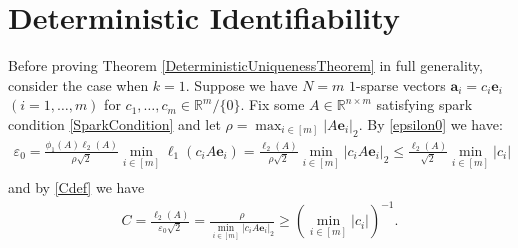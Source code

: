 \documentclass[journal, onecolumn]{IEEEtran}
\begin{document}
 

\section{Deterministic Identifiability}\label{DUT}


Before proving Theorem \ref{DeterministicUniquenessTheorem} in full generality, consider the case when $k=1$. Suppose we have $N = m$ $1$-sparse vectors $\mathbf{a}_i = c_i\mathbf{e}_i$ $(i = 1, \ldots, m)$ for $c_1, \ldots, c_m \in \mathbb{R}^m/\{0\}$. Fix some $A \in \mathbb{R}^{n \times m}$ satisfying spark condition \eqref{SparkCondition} and let $\rho = \max_{i \in [m]} |A\mathbf{e}_i|_2$. By \eqref{epsilon0} we have:
\begin{align}
\varepsilon_0 
= \frac{ \phi_1(A) \ell_{2}(A) }{\rho \sqrt{2}} \min_{i \in [m]} \ell_1(c_iA\mathbf{e}_i) 
= \frac{\ell_2(A)}{ \rho \sqrt{2}} \min_{i \in [m]}|c_iA\mathbf{e}_i|_2
\leq \frac{\ell_2(A)}{ \sqrt{2}} \min_{i \in [m]}|c_i| \\
\end{align}
%
and by \eqref{Cdef} we have
\begin{align}
C = \frac{\ell_{2}(A)}{ \varepsilon_0 \sqrt{2}} = \frac{ \rho }{ \min_{i \in [m]} |c_iA\mathbf{e}_i|_2 }
\geq (\min_{i \in [m]} |c_i|)^{-1}. \\
\end{align} 
\end{document}

